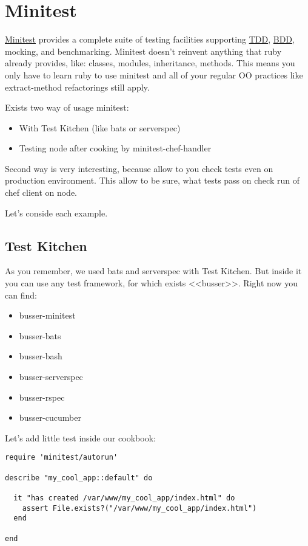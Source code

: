\section{Minitest}
\label{sec:testing-minitest}

\href{https://github.com/seattlerb/minitest}{Minitest} provides a complete suite of testing facilities supporting \href{http://en.wikipedia.org/wiki/Test-driven\_development}{TDD}, \href{http://en.wikipedia.org/wiki/Behavior-driven\_development}{BDD}, mocking, and benchmarking. Minitest doesn't reinvent anything that ruby already provides, like: classes, modules, inheritance, methods. This means you only have to learn ruby to use minitest and all of your regular OO practices like extract-method refactorings still apply.

Exists two way of usage minitest:

\begin{itemize}
  \item With Test Kitchen (like bats or serverspec)
  \item Testing node after cooking by minitest-chef-handler
\end{itemize}

Second way is very interesting, because allow to you check tests even on production environment. This allow to be sure, what tests pass on check run of chef client on node.

Let's conside each example.

\subsection{Test Kitchen}

As you remember, we used bats and serverspec with Test Kitchen. But inside it you can use any test framework, for which exists <<busser>>. Right now you can find:

\begin{itemize}
  \item busser-minitest
  \item busser-bats
  \item busser-bash
  \item busser-serverspec
  \item busser-rspec
  \item busser-cucumber
\end{itemize}

Let's add little test inside our cookbook:

\begin{lstlisting}[label=lst:testing-minitest1]
require 'minitest/autorun'

describe "my_cool_app::default" do

  it "has created /var/www/my_cool_app/index.html" do
    assert File.exists?("/var/www/my_cool_app/index.html")
  end

end
\end{lstlisting}


